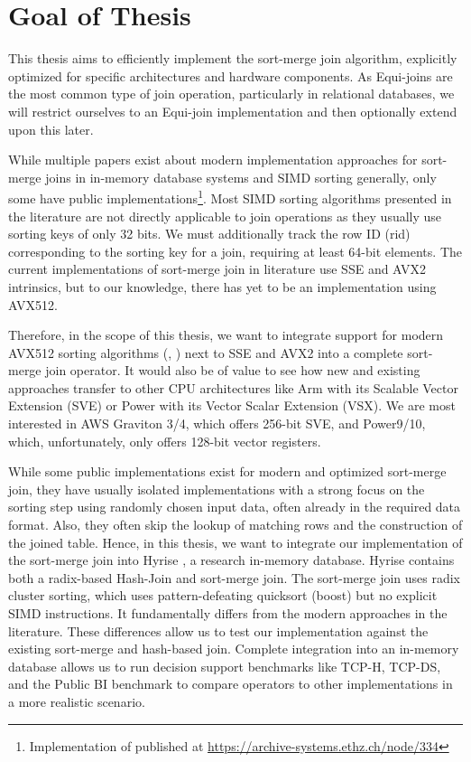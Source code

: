 \section{Goal of Thesis}
\label{sec:goal}


This thesis aims to efficiently implement the sort-merge join algorithm,
explicitly optimized for specific architectures and hardware components. 
As Equi-joins are the most common type of join operation, particularly in relational databases,
we will restrict ourselves to an Equi-join implementation and then optionally extend upon this later.

While multiple papers exist about modern implementation approaches for sort-merge joins in in-memory database systems
and SIMD sorting generally, only some have public 
implementations\footnote{Implementation of \cite{Balkesen} published at \url{https://archive-systems.ethz.ch/node/334}}.
Most SIMD sorting algorithms
presented in the literature are not directly applicable to join operations as they usually use
sorting keys of only 32 bits. We must additionally track the row ID (rid) corresponding to the sorting key for
a join, requiring at least 64-bit elements. The current implementations of sort-merge join in literature use SSE and AVX2 intrinsics,
but to our knowledge, there has yet to be an implementation using AVX512. 

Therefore, in the scope
of this thesis, we want to integrate support for modern AVX512 sorting algorithms (\cite{Watkins}, \cite{8855628})
next to SSE and AVX2 into a complete sort-merge join operator.
It would also be of value to see how new and existing approaches transfer to other CPU
architectures like Arm with its Scalable Vector Extension (SVE) or Power with its Vector Scalar
Extension (VSX). We are most interested in AWS Graviton 3/4, which offers 256-bit SVE,
and Power9/10, which, unfortunately, only offers 128-bit vector registers.

While some public implementations
exist for modern and optimized sort-merge join, they have usually isolated implementations with a strong
focus on the sorting step using randomly chosen input data, often already in the required data format. 
Also, they often skip the lookup of matching rows and the construction of the joined table.
Hence, in this thesis, we want to integrate our implementation of the sort-merge join into Hyrise
\cite{DBLP:conf/edbt/DreselerK0KUP19},
a research in-memory database. Hyrise contains both a radix-based Hash-Join and sort-merge join.
The sort-merge join uses radix cluster sorting, which uses pattern-defeating quicksort (boost)
but no explicit SIMD instructions. It fundamentally differs from the modern approaches in the literature.
These differences allow us to test our implementation against the existing sort-merge and hash-based join.
Complete integration into an in-memory database allows us to run decision support benchmarks
like TCP-H, TCP-DS, and the Public BI benchmark to compare operators to other implementations in a 
more realistic scenario.

